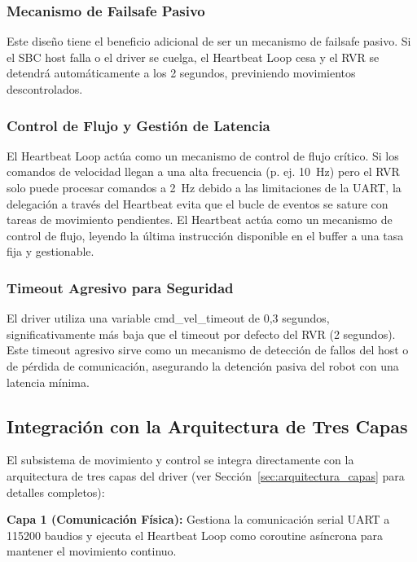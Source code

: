 \documentclass[11pt]{article}
\newcommand{\code}[1]{\textcolor{codeblue}{\url{#1}}}
\numberwithin{figure}{section}
\numberwithin{table}{section}
\def\code#1{#1}%
\begin{document}
\subsubsection{Mecanismo de Failsafe Pasivo}

Este diseño tiene el beneficio adicional de ser un mecanismo de failsafe pasivo. Si el SBC host falla o el driver se cuelga, el Heartbeat Loop cesa y el RVR se detendrá automáticamente a los 2 segundos, previniendo movimientos descontrolados.


\subsubsection{Control de Flujo y Gestión de Latencia}

El Heartbeat Loop actúa como un mecanismo de control de flujo crítico. Si los comandos de velocidad llegan a una alta frecuencia (p. ej. 10~Hz) pero el RVR solo puede procesar comandos a 2~Hz debido a las limitaciones de la UART, la delegación a través del Heartbeat evita que el bucle de eventos se sature con tareas de movimiento pendientes. El Heartbeat actúa como un mecanismo de control de flujo, leyendo la última instrucción disponible en el buffer a una tasa fija y gestionable.


\subsubsection{Timeout Agresivo para Seguridad}

El driver utiliza una variable \code{cmd\_vel\_timeout} de 0,3 segundos, significativamente más baja que el timeout por defecto del RVR (2 segundos). Este timeout agresivo sirve como un mecanismo de detección de fallos del host o de pérdida de comunicación, asegurando la detención pasiva del robot con una latencia mínima.


\subsection{Integración con la Arquitectura de Tres Capas}

El subsistema de movimiento y control se integra directamente con la arquitectura de tres capas del driver (ver Sección~\ref{sec:arquitectura_capas} para detalles completos):

\textbf{Capa 1 (Comunicación Física):} Gestiona la comunicación serial UART a 115200 baudios y ejecuta el Heartbeat Loop como coroutine asíncrona para mantener el movimiento continuo.
\end{document}
